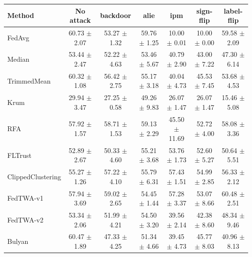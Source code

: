 \begin{tabular}{lcccccc}
\toprule
Method & No attack & backdoor & alie & ipm & sign-flip & label-flip \\
\midrule
FedAvg & 60.73 $\pm$ 2.07 & 53.27 $\pm$ 1.32 & 59.76 $\pm$ 1.25 & 10.00 $\pm$ 0.01 & 10.00 $\pm$ 0.00 & 59.58 $\pm$ 2.09 \\
Median & 53.44 $\pm$ 2.47 & 52.22 $\pm$ 4.63 & 53.46 $\pm$ 5.67 & 40.79 $\pm$ 2.90 & 43.00 $\pm$ 7.22 & 47.30 $\pm$ 6.14 \\
TrimmedMean & 60.32 $\pm$ 1.08 & 56.42 $\pm$ 2.75 & 55.17 $\pm$ 3.18 & 40.04 $\pm$ 4.73 & 45.53 $\pm$ 7.45 & 53.68 $\pm$ 4.53 \\
Krum & 29.94 $\pm$ 3.47 & 27.25 $\pm$ 0.58 & 49.26 $\pm$ 9.83 & 26.07 $\pm$ 1.47 & 26.07 $\pm$ 1.47 & 15.46 $\pm$ 5.08 \\
RFA & 57.92 $\pm$ 1.57 & 58.71 $\pm$ 1.53 & 59.13 $\pm$ 2.29 & 45.50 $\pm$ 11.69 & 52.72 $\pm$ 4.00 & 58.08 $\pm$ 3.36 \\
FLTrust & 52.89 $\pm$ 2.67 & 50.33 $\pm$ 4.60 & 55.21 $\pm$ 3.68 & 53.76 $\pm$ 1.73 & 52.60 $\pm$ 5.27 & 50.64 $\pm$ 5.51 \\
ClippedClustering & 55.27 $\pm$ 1.26 & 57.22 $\pm$ 4.10 & 55.79 $\pm$ 6.31 & 57.43 $\pm$ 1.51 & 54.99 $\pm$ 2.85 & 56.33 $\pm$ 2.12 \\
FedTWA-v1 & 57.94 $\pm$ 3.69 & 59.02 $\pm$ 2.65 & 54.45 $\pm$ 1.44 & 57.28 $\pm$ 3.37 & 53.07 $\pm$ 8.66 & 60.48 $\pm$ 2.51 \\
FedTWA-v2 & 53.34 $\pm$ 2.06 & 51.99 $\pm$ 4.21 & 54.50 $\pm$ 3.20 & 39.56 $\pm$ 2.14 & 42.38 $\pm$ 8.60 & 48.34 $\pm$ 9.46 \\
Bulyan & 60.47 $\pm$ 1.89 & 47.33 $\pm$ 4.25 & 51.34 $\pm$ 4.66 & 39.45 $\pm$ 4.73 & 45.77 $\pm$ 8.03 & 40.96 $\pm$ 8.13 \\
\bottomrule
\end{tabular}